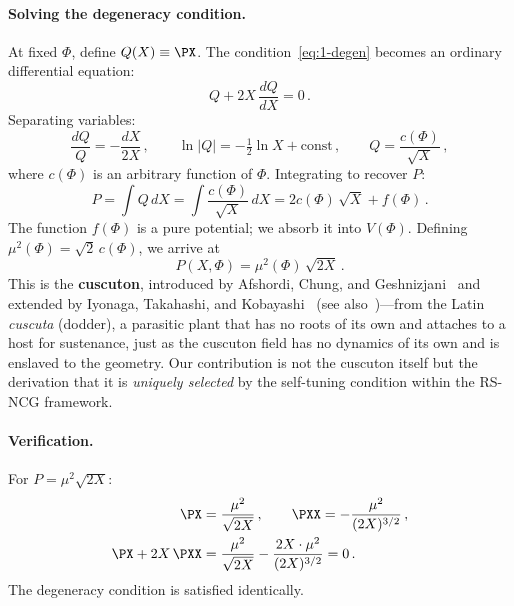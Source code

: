 \paragraph{Solving the degeneracy condition.} At fixed $\Phi$, define $Q(X) \equiv \PX$. The condition~\eqref{eq:1-degen} becomes an ordinary differential equation:
\begin{equation}
\label{eq:1-ode}
Q + 2X\, \frac{dQ}{dX} = 0\,.
\end{equation}
Separating variables:
\begin{equation}
\label{eq:1-ode-solve}
\frac{dQ}{Q} = -\frac{dX}{2X}\,, \qquad
\ln|Q| = -\tfrac{1}{2}\ln X + \mathrm{const}\,, \qquad
Q = \frac{c(\Phi)}{\sqrt{X}}\,,
\end{equation}
where $c(\Phi)$ is an arbitrary function of $\Phi$. Integrating to recover $P$:
\begin{equation}
\label{eq:1-integrate-P}
P = \int Q\, dX = \int \frac{c(\Phi)}{\sqrt{X}}\, dX = 2c(\Phi)\,\sqrt{X} + f(\Phi)\,.
\end{equation}
The function $f(\Phi)$ is a pure potential; we absorb it into $V(\Phi)$. Defining $\mu^2(\Phi) = \sqrt{2}\,c(\Phi)$, we arrive at
\begin{equation}
\label{eq:1-cuscuton}
\boxed{P(X, \Phi) = \mu^2(\Phi)\,\sqrt{2X}\,.}
\end{equation}
This is the \textbf{cuscuton}, introduced by Afshordi, Chung, and Geshnizjani~\cite{ch1:afshordi07} and extended by Iyonaga, Takahashi, and Kobayashi~\cite{ch1:iyonaga18} (see also~\cite{ch1:appleby22})---from the Latin \emph{cuscuta} (dodder), a parasitic plant that has no roots of its own and attaches to a host for sustenance, just as the cuscuton field has no dynamics of its own and is enslaved to the geometry. Our contribution is not the cuscuton itself but the derivation that it is \emph{uniquely selected} by the self-tuning condition within the RS-NCG framework.

\paragraph{Verification.} For $P = \mu^2\sqrt{2X}$:
\begin{align}
\label{eq:1-verify}
\PX &= \frac{\mu^2}{\sqrt{2X}}\,, \qquad
\PXX = -\frac{\mu^2}{(2X)^{3/2}}\,, \notag\\
\PX + 2X\,\PXX &= \frac{\mu^2}{\sqrt{2X}} - \frac{2X \cdot \mu^2}{(2X)^{3/2}} = 0\,.
\end{align}
The degeneracy condition is satisfied identically.

